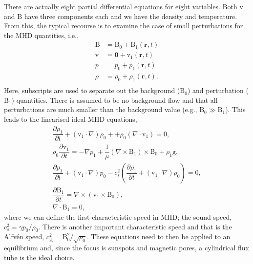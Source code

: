     There are actually eight partial differential equations for eight variables.
    Both $\boldsymbol{\mathrm{v}}$ and $\boldsymbol{\mathrm{B}}$ have three components each and we have the density and temperature.
    From this, the typical recourse is to examine the case of small perturbations for the MHD quantities, i.e.,
    \begin{align*}                                                         
        \boldsymbol{\mathrm{B}} &= \boldsymbol{\mathrm{B}}_0 + \boldsymbol{\mathrm{B}}_1(\boldsymbol{r},t)\\               
        \boldsymbol{\mathrm{v}} &= \boldsymbol{0} + \boldsymbol{\mathrm{v}}_1(\boldsymbol{r},t)\\               
        p &= p_0 + {p_1}(\boldsymbol{r},t)\\               
        \rho &= \rho_0 + {\rho_1}(\boldsymbol{r},t).\\              
    \end{align*}
    Here, subscripts are used to separate out the background ($\mathrm{B}_0$) and perturbation ($\mathrm{B}_1$) quantities.
    There is assumed to be no background flow and that all perturbations are much smaller than the background value (e.g., $\mathrm{B}_0 \gg \mathrm{B}_1$).      
    This leads to the linearised ideal MHD equations,
    \begin{align}                                                         
    \dfrac{\partial \rho_1 }{\partial t} + (\boldsymbol{\mathrm{v}}_1 \cdot \nabla)\rho_0 + + \rho_0 (\nabla \cdot \boldsymbol{\mathrm{v}}_1) =       
    0,\tag{Mass Conservation}\\                                  
    \rho_0 \dfrac{\partial \boldsymbol{\mathrm{v}}_1}{\partial t} =
    -\nabla p_1 + \dfrac{1}{\mu}(\nabla \times \boldsymbol{\mathrm{B}}_1) \times \boldsymbol{\mathrm{B}}_0 + \rho_1 \boldsymbol{\mathrm{g}},\tag{Equation of Motion}\\
    \dfrac{\partial p_1}{\partial t} + (\boldsymbol{\mathrm{v}}_1 \cdot \nabla)p_0 - c_s^2 \left( \dfrac{\partial \rho_1}{\partial t} + (\boldsymbol{\mathrm{v}}_1 \cdot \nabla)\rho_0 \right) = 0,\tag{Energy Equation}\\       
    \dfrac{\partial \boldsymbol{\mathrm{B}}_1}{\partial t} = \nabla \times (\boldsymbol{\mathrm{v}}_1 \times \boldsymbol{\mathrm{B}}_0),\tag{Induction Equation}\\
    \nabla \cdot \boldsymbol{\mathrm{B}}_1 = 0, \tag{Solenoid Equation}               
    \end{align}
    where we can define the first characteristic speed in MHD; the sound speed, $c_s^2 = {\gamma p_0}/{\rho_0}$.
    There is another important characteristic speed and that is the Alfv\'{e}n speed, $c_A^2 = {\mathrm{B}_0^2}/{\sqrt{\rho_0}}$.
    These equations need to then be applied to an equilibrium and, since the focus is sunspots and magnetic pores, a cylindrical flux tube is the ideal choice.
    

